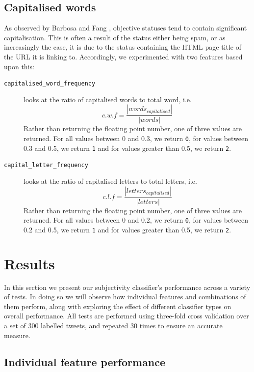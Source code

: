 \subsection{Capitalised words}

As observed by Barbosa and Fang \cite{Barbosa:ws}, objective statuses tend to contain significant capitalisation. This is often a result of the status either being spam, or as increasingly the case, it is due to the status containing the HTML page title of the URL it is linking to. Accordingly, we experimented with two features based upon this:

\begin{description}
	\item [\texttt{capitalised\_word\_frequency}] {looks at the ratio of capitalised words to total word, i.e.
	\begin{equation}
		c.w.f = \frac{|words_{capitalised}|}{|words|}
	\end{equation}
	Rather than returning the floating point number, one of three values are returned. For all values between 0 and 0.3, we return \texttt{0}, for values between 0.3 and 0.5, we return \texttt{1} and for values greater than 0.5, we return \texttt{2}.
	}
	\item [\texttt{capital\_letter\_frequency}] looks at the ratio of capitalised letters to total letters, i.e.
	\begin{equation}
		c.l.f = \frac{|letters_{capitalised}|}{|letters|}
	\end{equation}
	Rather than returning the floating point number, one of three values are returned. For all values between 0 and 0.2, we return \texttt{0}, for values between 0.2 and 0.5, we return \texttt{1} and for values greater than 0.5, we return \texttt{2}.
\end{description}

\section{Results}

In this section we present our subjectivity classifier's performance across a variety of tests. In doing so we will observe how individual features and combinations of them perform, along with exploring the effect of different classifier types on overall performance. All tests are performed using three-fold cross validation over a set of 300 labelled tweets, and repeated 30 times to ensure an accurate measure.

\subsection{Individual feature performance}

